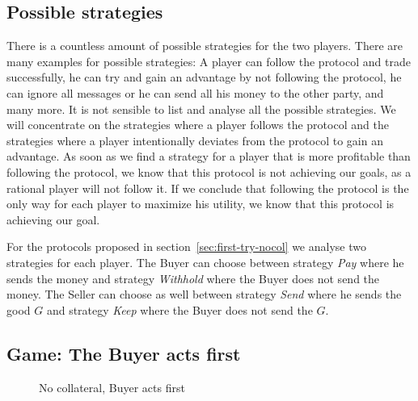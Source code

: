 \documentclass{cacthesis}
\begin{document}

\subsection{Possible strategies}
\label{sec:possible-strategies}
There is a countless amount of possible strategies for the two players. There are many examples for possible strategies: A player can follow the protocol and trade successfully, he can try and gain an advantage by not following the protocol, he can ignore all messages or he can send all his money to the other party, and many more. It is not sensible to list and analyse all the possible strategies. We will concentrate on the strategies where a player follows the protocol and the strategies where a player intentionally deviates from the protocol to gain an advantage. As soon as we find a strategy for a player that is more profitable than following the protocol, we know that this protocol is not achieving our goals, as a rational player will not follow it. If we conclude that following the protocol is the only way for each player to maximize his utility, we know that this protocol is achieving our goal. \newline

For the protocols proposed in section~\ref{sec:first-try-nocol} we analyse two strategies for each player. The Buyer can choose between strategy \emph{Pay} where he sends the money and strategy \emph{Withhold} where the Buyer does not send the money. The Seller can choose as well between strategy \emph{Send} where he sends the good $G$ and strategy \emph{Keep} where the Buyer does not send the $G$.
\subsection{Game: The Buyer acts first}
\begin{figure}[htb!]
\label{fig:nocol-Buyer-first}
\centering
\caption{No collateral, Buyer acts first}
\end{figure}
\end{document}
